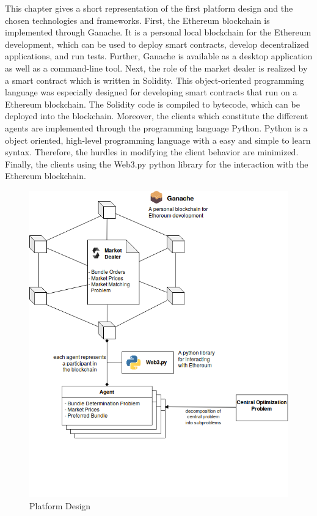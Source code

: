 This chapter gives a short representation of the first platform design and the chosen technologies and frameworks. First, the Ethereum blockchain is implemented through Ganache. It is a personal local blockchain for the Ethereum development, which can be used to deploy smart contracts, develop decentralized applications, and run tests. Further, Ganache is available as a desktop application as well as a command-line tool. Next, the role of the market dealer is realized by a smart contract which is written in Solidity. This object-oriented programming language was especially designed for developing smart contracts that run on a Ethereum blockchain. The Solidity code is compiled to bytecode, which can be deployed into the blockchain. Moreover, the clients which constitute the different agents are implemented through the programming language Python. Python is a object oriented, high-level programming  language with a easy and simple to learn syntax. Therefore, the hurdles in modifying the client behavior are minimized. Finally, the clients using the Web3.py python library for the interaction with the Ethereum blockchain. 

\begin{figure}[htbp]
	\centering
	\includegraphics[width=.8\linewidth]{./figures/platform_architecture.png}
	\caption{Platform Design}
	\label{figure:paltform_architecture}
\end{figure}